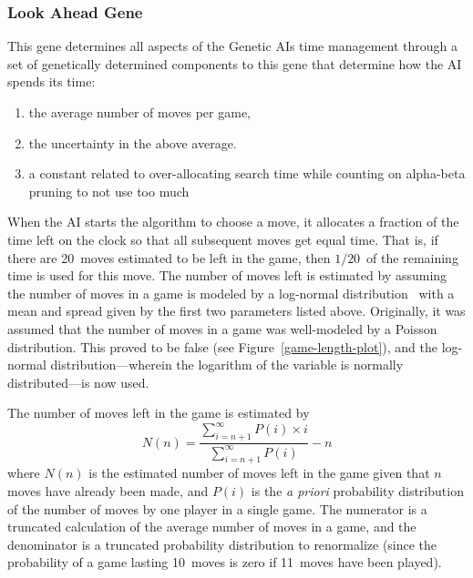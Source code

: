 \documentclass[letterpaper]{article}
\renewcommand{\_}{\allowbreak\textunderscore\allowbreak}
\begin{document}
\subsubsection{Look Ahead Gene}
This gene determines all aspects of the Genetic AIs time management through a set of genetically determined components to this gene that determine how the AI spends its time:
\begin{enumerate}
	\item the average number of moves per game,
	\item the uncertainty in the above average.
	\item a constant related to over-allocating search time while counting on alpha-beta pruning to not use too much
\end{enumerate}
When the AI starts the algorithm to choose a move, it allocates a fraction of the time left on the clock so that all subsequent moves get equal time. That is, if there are 20~moves estimated to be left in the game, then \(1/20\)~of the remaining time is used for this move. The number of moves left is estimated by assuming the number of moves in a game is modeled by a log-normal distribution~\cite{log-norm-wiki}\cite{log-norm-chess-se} with a mean and spread given by the first two parameters listed above. Originally, it was assumed that the number of moves in a game was well-modeled by a Poisson distribution. This proved to be false (see Figure~\ref{game-length-plot}), and the log-normal distribution---wherein the logarithm of the variable is normally distributed---is now used.

The number of moves left in the game is estimated by
\[N(n) = \frac{\sum_{i = n + 1}^\infty P(i)\times{}i}{\sum_{i = n + 1}^\infty P(i)} - n\]
where \(N(n)\) is the estimated number of moves left in the game given that \(n\) moves have already been made, and \(P(i)\) is the \emph{a priori} probability distribution of the number of moves by one player in a single game. The numerator is a truncated calculation of the average number of moves in a game, and the denominator is a truncated probability distribution to renormalize (since the probability of a game lasting 10~moves is zero if 11~moves have been played).
\end{document}
